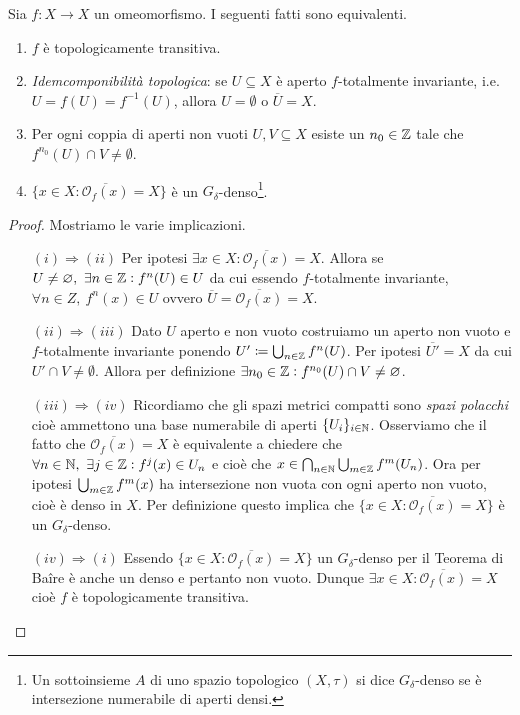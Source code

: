 \begin{theorem}
	Sia $ f \colon X \to X $ un omeomorfismo. I seguenti fatti sono equivalenti.
	\begin{enumerate}[label=(\roman*)]
		\item $ f $ è topologicamente transitiva.
		\item \emph{Idemcomponibilità topologica}: se $ U \subseteq X $ è aperto $ f $-totalmente invariante, i.e. $ U = f(U) = f^{-1}(U) $, allora $ U = \emptyset $ o $ \overline{U} = X $.
		\item Per ogni coppia di aperti non vuoti $ U, V \subseteq X $ esiste un $ n_0 \in \mathbb{Z} $ tale che $ f^{n_0}(U) \cap V \neq \emptyset $. 
		\item $ \{x \in X : \overline{\mathcal{O}_f(x)} = X\} $ è un $ G_\delta $-denso\footnote{%
			Un sottoinsieme $ A $ di uno spazio topologico $ (X, \tau) $ si dice $ G_\delta $-denso se è intersezione numerabile di aperti densi. 
		}.
	\end{enumerate}
\end{theorem}
%
\begin{proof}
	Mostriamo le varie implicazioni. 
	\begin{enumerate}
		\item[$ (i) \Rightarrow (ii) $] Per ipotesi $ \exists x \in X : \overline{\mathcal{O}_f(x)} = X $. Allora se $ U \neq \varnothing, \ \exists n \in \mathbb{Z} : f^{n}(U) \in U $ da cui essendo $ f $-totalmente invariante, $ \forall n \in Z, \ f^n(x) \in U $ ovvero $ \overline{U} = \overline{\mathcal{O}_f(x)} = X $. 
		\item[$ (ii) \Rightarrow (iii) $] Dato $ U $ aperto e non vuoto costruiamo un aperto non vuoto e $ f $-totalmente invariante ponendo $ U' \coloneqq \bigcup_{n \in \mathbb{Z}} f^n(U) $. Per ipotesi $ \overline{U'} = X $ da cui $ U' \cap V \neq \emptyset $. Allora per definizione $ \exists n_0 \in \mathbb{Z} : f^{n_0}(U) \cap V \neq \varnothing $.
		\item[$ (iii) \Rightarrow (iv) $] Ricordiamo che gli spazi metrici compatti sono \emph{spazi polacchi} cioè ammettono una base numerabile di aperti $ \{U_i\}_{i \in \mathbb{N}} $. Osserviamo che il fatto che $ \overline{\mathcal{O}_f(x)} = X $ è equivalente a chiedere che $ \forall n \in \mathbb{N}, \ \exists j \in \mathbb{Z} : f^j(x) \in U_n $ e cioè che $ x \in \bigcap_{n \in \mathbb{N}} \bigcup_{m \in \mathbb{Z}} f^{m}(U_n) $. Ora per ipotesi $ \bigcup_{m \in \mathbb{Z}} f^m(x) $ ha intersezione non vuota con ogni aperto non vuoto, cioè è denso in $ X $. Per definizione questo implica che $ \{x \in X : \overline{\mathcal{O}_f(x)} = X\} $ è un $ G_\delta $-denso. 
		\item[$ (iv) \Rightarrow (i) $] Essendo $ \{x \in X : \overline{\mathcal{O}_f(x)} = X\} $ un $ G_\delta $-denso per il Teorema di Ba\^{i}re è anche un denso e pertanto non vuoto. Dunque $ \exists x \in X : \overline{\mathcal{O}_f(x)} = X $ cioè $ f $ è topologicamente transitiva. \qedhere
	\end{enumerate}
\end{proof}

